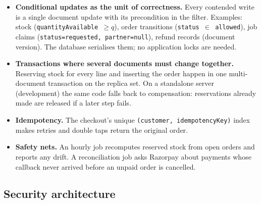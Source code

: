 \documentclass[11pt,a4paper]{article}
\begin{document}
\begin{itemize}
  \item \textbf{Conditional updates as the unit of correctness.} Every contended write is a single document update with its precondition in the filter. Examples: stock (\texttt{quantityAvailable $\ge q$}), order transitions (\texttt{status $\in$ allowed}), job claims (\texttt{status=requested, partner=null}), refund records (document version). The database serialises them; no application locks are needed.
  \item \textbf{Transactions where several documents must change together.} Reserving stock for every line and inserting the order happen in one multi-document transaction on the replica set. On a standalone server (development) the same code falls back to compensation: reservations already made are released if a later step fails.
  \item \textbf{Idempotency.} The checkout's unique \texttt{(customer, idempotencyKey)} index makes retries and double taps return the original order.
  \item \textbf{Safety nets.} An hourly job recomputes reserved stock from open orders and reports any drift. A reconciliation job asks Razorpay about payments whose callback never arrived before an unpaid order is cancelled.
\end{itemize}

\subsection{Security architecture}
\end{document}

